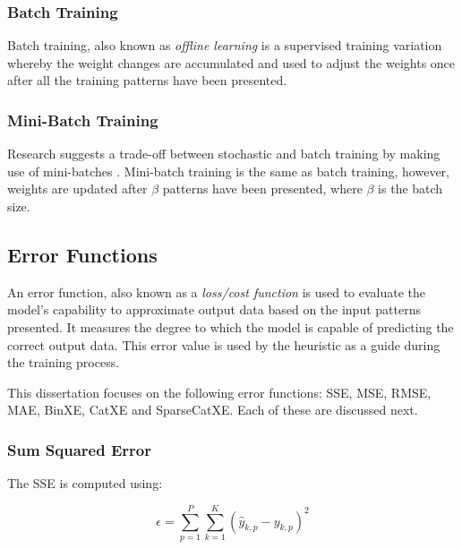 \subsubsection{Batch Training}
\label{sec:anns:training:batch}

Batch training, also known as \textit{offline learning} is a supervised training variation whereby
the weight changes are accumulated and used to adjust the weights once after all
the training patterns have been presented. 


\subsubsection{Mini-Batch Training}
\label{sec:anns:training:mini_batch}

Research suggests a trade-off between stochastic and batch training by making
use of mini-batches \cite{ref:bengio:2012}. Mini-batch training is the same as
batch training, however, weights are updated after $\beta$ patterns have been
presented, where $\beta$ is the batch size.


\subsection{Error Functions}
\label{sec:anns:training:error_functions}

An error function, also known as a \textit{loss/cost function} is used to
evaluate the model's capability to approximate output data based on the input
patterns presented. It measures the degree to which the model is capable of
predicting the correct output data.  This error value is used by the
heuristic as a guide during the training process.

This dissertation focuses on the following error functions: \ac{SSE}, \ac{MSE},
\ac{RMSE}, \ac{MAE}, \ac{BinXE}, \ac{CatXE} and \ac{SparseCatXE}. Each of these
are discussed next.


\subsubsection{Sum Squared Error}
\label{sec:anns:training:error_functions:sse}

The \ac{SSE} is computed using:

\begin{equation}
    \epsilon = \sum_{p=1}^P \sum_{k=1}^K (\hat{y}_{k,p} - y_{k,p})^2
    \label{eq:sse}
\end{equation}


